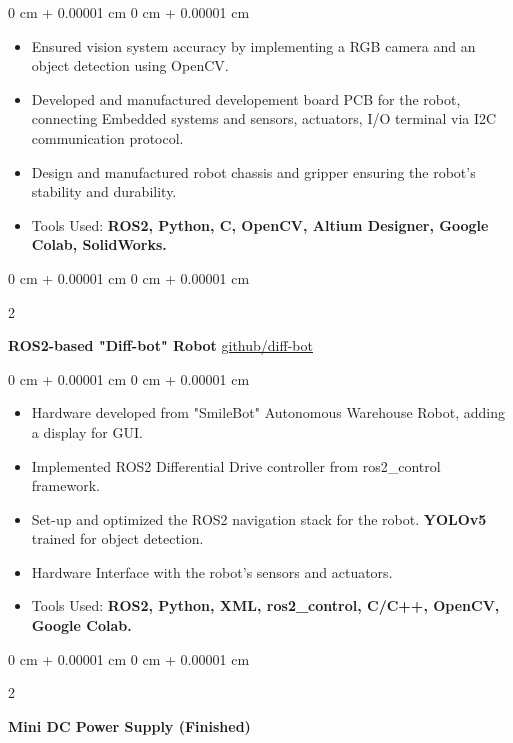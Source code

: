 \documentclass[10pt, letterpaper]{article}
\newenvironment{highlights}{
    \begin{itemize}[
        topsep=0.10 cm,
        parsep=0.10 cm,
        partopsep=0pt,
        itemsep=0pt,
        leftmargin=0 cm + 10pt
    ]
}{
    \end{itemize}
} %
\newenvironment{onecolentry}{
    \begin{adjustwidth}{
        0 cm + 0.00001 cm
    }{
        0 cm + 0.00001 cm
    }
}{
    \end{adjustwidth}
} %
\newenvironment{twocolentry}[2][]{
    \onecolentry
    \def\secondColumn{#2}
    \setcolumnwidth{\fill, 4.5 cm}
    \begin{paracol}{2}
}{
    \switchcolumn \raggedleft \secondColumn
    \end{paracol}
    \endonecolentry
} %
\begin{document}
\vspace{0.10 cm}
\begin{onecolentry}
      \begin{highlights}
            \item Ensured vision system accuracy by implementing a RGB camera and an object
            detection using OpenCV.
            \item Developed and manufactured developement board PCB for the robot, connecting
            Embedded systems and sensors, actuators, I/O terminal via I2C communication
            protocol.
            \item Design and manufactured robot chassis and gripper ensuring the robot's
            stability and durability.
            \item Tools Used:\textbf{ ROS2, Python, C, OpenCV, Altium Designer, Google Colab,
                  SolidWorks.}
      \end{highlights}
\end{onecolentry}

\vspace{0.4 cm}

\begin{twocolentry}{
            \href{https://github.com/bocho0600/EGB320-Group16}{github/diff-bot}
      }
      \textbf{ROS2-based "Diff-bot" Robot}\end{twocolentry}

\vspace{0.10 cm}
\begin{onecolentry}
      \begin{highlights}
            \item Hardware developed from "SmileBot" Autonomous Warehouse Robot, adding a display
            for GUI.
            \item Implemented ROS2 Differential Drive controller from ros2\_control framework.
            \item Set-up and optimized the ROS2 navigation stack for the robot. \textbf{YOLOv5}
            trained for object detection.
            \item Hardware Interface with the robot's sensors and actuators.
            \item Tools Used: \textbf{ROS2, Python, XML, ros2\_control, C/C++, OpenCV, Google
                  Colab.}
      \end{highlights}
\end{onecolentry}

\vspace{0.4 cm}
\begin{twocolentry}{
      }
      \textbf{Mini DC Power Supply (Finished)}\end{twocolentry}
\end{document}

